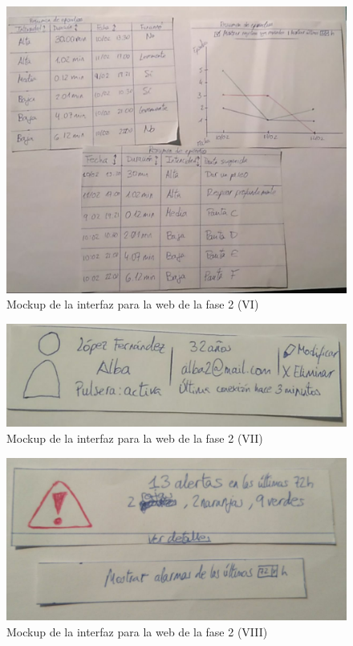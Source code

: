 \begin{figure}[!htbp]
    \centering
    \includegraphics[scale=0.3]{Imagenes/anxA7.jpg}
    \caption[Mockup de la interfaz para la web de la fase 1 (VI)]{Mockup de la interfaz para la web de la fase 2 (VI)}
    \label{fig:mockup7}
\end{figure}

\begin{figure}[!htbp]
    \centering
    \includegraphics[scale=0.3]{Imagenes/anxA8.jpg}
    \caption[Mockup de la interfaz para la web de la fase 1 (VII)]{Mockup de la interfaz para la web de la fase 2 (VII)}
    \label{fig:mockup8}
\end{figure}

\begin{figure}[!htbp]
    \centering
    \includegraphics[scale=0.3]{Imagenes/anxA9.jpg}
    \caption[Mockup de la interfaz para la web de la fase 1 (VIII)]{Mockup de la interfaz para la web de la fase 2 (VIII)}
    \label{fig:mockup9}
\end{figure}

